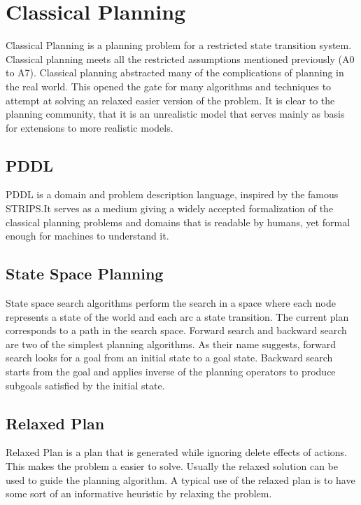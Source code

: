 \documentclass
[a4paper
,english
,parskip=half
,bibliography=totoc
]{scrreprt}
\begin{document}
    \section{Classical Planning} \label{classical_planning}
    Classical Planning is a planning problem for a restricted state transition system. Classical planning meets all the restricted assumptions mentioned previously (A0 to A7). Classical planning abstracted many of the complications of planning in the real world. This opened the gate for many algorithms and techniques to attempt at solving an relaxed easier version of the problem. It is clear to the planning community, that it is an unrealistic model that serves mainly as basis for extensions to more realistic models.
       
        \subsection{PDDL}
        PDDL is a domain and problem description language, inspired by the famous STRIPS.It serves as a medium giving a widely accepted formalization of the classical planning problems and domains that is readable by humans, yet formal enough for machines to understand it.

        \subsection{State Space Planning}
        State space search algorithms perform the search in a space where each node represents a state of the world and each arc a state transition. The current plan corresponds to a path in the search space.
        Forward search and backward search are two of the simplest planning algorithms. As their name suggests, forward search looks for a goal from an initial state to a goal state. Backward search starts from the goal and applies inverse of the planning operators to produce subgoals satisfied by the initial state.

        \subsection{Relaxed Plan}
        Relaxed Plan is a plan that is generated while ignoring delete effects of actions. This makes the problem a easier to solve. Usually the relaxed solution can be used to guide the planning algorithm. A typical use of the relaxed plan is to have some sort of an informative heuristic by relaxing the problem. 
\end{document}
